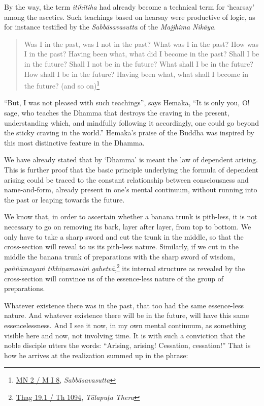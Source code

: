 By the way, the term \emph{itihītiha} had already become a technical term for `hearsay' among the ascetics. Such teachings based on hearsay were productive of logic, as for instance testified by the \emph{Sabbāsavasutta} of the \emph{Majjhima Nikāya}.

\begin{quote}
Was I in the past, was I not in the past? What was I in the past? How was I in the past? Having been what, what did I become in the past? Shall I be in the future? Shall I not be in the future? What shall I be in the future? How shall I be in the future? Having been what, what shall I become in the future? (and so on)\footnote{\href{https://suttacentral.net/mn2/pli/ms}{MN 2 / M I 8}, \emph{Sabbāsavasutta}}
\end{quote}

``But, I was not pleased with such teachings'', says Hemaka, ``It is only you, O! sage, who teaches the Dhamma that destroys the craving in the present, understanding which, and mindfully following it accordingly, one could go beyond the sticky craving in the world.'' Hemaka's praise of the Buddha was inspired by this most distinctive feature in the Dhamma.

We have already stated that by `Dhamma' is meant the law of dependent arising. This is further proof that the basic principle underlying the formula of dependent arising could be traced to the constant relationship between consciousness and name-and-form, already present in one's mental continuum, without running into the past or leaping towards the future.

We know that, in order to ascertain whether a banana trunk is pith-less, it is not necessary to go on removing its bark, layer after layer, from top to bottom. We only have to take a sharp sword and cut the trunk in the middle, so that the cross-section will reveal to us its pith-less nature. Similarly, if we cut in the middle the banana trunk of preparations with the sharp sword of wisdom, \emph{paññāmayaṁ tikhiṇamasiṁ gahetvā},\footnote{\href{https://suttacentral.net/thag19.1/pli/ms}{Thag 19.1 / Th 1094}, \emph{Tālapuṭa Thera}} its internal structure as revealed by the cross-section will convince us of the essence-less nature of the group of preparations.

Whatever existence there was in the past, that too had the same essence-less nature. And whatever existence there will be in the future, will have this same essencelessness. And I see it now, in my own mental continuum, as something visible here and now, not involving time. It is with such a conviction that the noble disciple utters the words: ``Arising, arising! Cessation, cessation!'' That is how he arrives at the realization summed up in the phrase:

